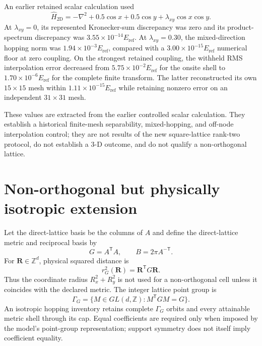 \documentclass[11pt]{article}
\newcommand{\Z}{\mathbb Z}
\begin{document}
An earlier retained scalar calculation used
\begin{equation}
 \widehat H_{2\mathrm D}=-\nabla^2+0.5\cos x+0.5\cos y
 +\lambda_{xy}\cos x\cos y.
 \label{eq:legacy-2d}
\end{equation}
At $\lambda_{xy}=0$, its represented Kronecker-sum discrepancy was zero and its
product-spectrum discrepancy was $3.55\times10^{-14}E_{\mathrm{ref}}$. At $\lambda_{xy}=0.30$, the
mixed-direction hopping norm was $1.94\times10^{-3}E_{\mathrm{ref}}$, compared with a
$3.00\times10^{-15}E_{\mathrm{ref}}$ numerical floor at zero coupling. On the strongest retained
coupling, the withheld RMS interpolation error decreased from
$5.75\times10^{-2}E_{\mathrm{ref}}$ for the onsite shell to $1.70\times10^{-6}E_{\mathrm{ref}}$ for the complete
finite transform. The latter reconstructed its own $15\times15$ mesh within
$1.11\times10^{-15}E_{\mathrm{ref}}$ while retaining nonzero error on an independent
$31\times31$ mesh.

These values are extracted from the earlier controlled scalar calculation. They
establish a historical finite-mesh separability, mixed-hopping, and off-node
interpolation control; they are not results of the new square-lattice rank-two protocol,
do not establish a 3-D outcome, and do not qualify a non-orthogonal lattice.

\section{Non-orthogonal but physically isotropic extension}

Let the direct-lattice basis be the columns of $A$ and define the direct-lattice metric
and reciprocal basis by
\begin{equation}
 G=A^{\mathsf T}A,
 \qquad B=2\pi A^{-\mathsf T}.
\end{equation}
For $\mathbf R\in\Z^d$, physical squared distance is
\begin{equation}
 r_G^2(\mathbf R)=\mathbf R^{\mathsf T}G\mathbf R.
 \label{eq:metric-radius}
\end{equation}
Thus the coordinate radius $R_x^2+R_y^2$ is not used for a non-orthogonal cell unless it
coincides with the declared metric. The integer lattice point group is
\begin{equation}
 \Gamma_G=\{M\in GL(d,\Z):M^{\mathsf T}GM=G\}.
 \label{eq:metric-group}
\end{equation}
An isotropic hopping inventory retains complete $\Gamma_G$ orbits and every attainable
metric shell through its cap. Equal coefficients are required only when imposed by the
model's point-group representation; support symmetry does not itself imply coefficient
equality.
\end{document}
